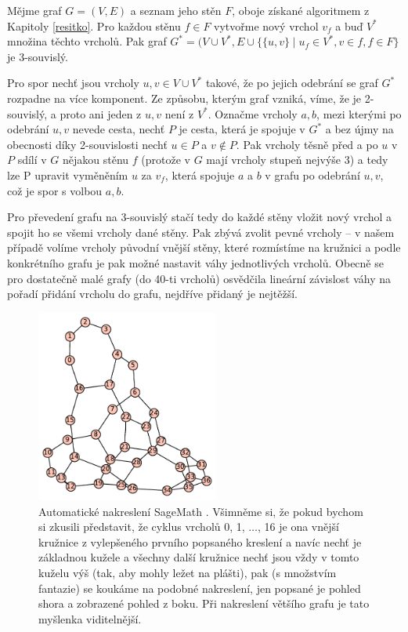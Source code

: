 \begin{tvrz} \label{prevodNa3Spoj}
Mějme graf $G=(V,E)$ a seznam jeho stěn $F$, oboje získané algoritmem z Kapitoly \ref{resitko}. Pro každou stěnu $f \in F$ vytvořme nový vrchol $v_f$ a buď $V^*$ množina těchto vrcholů.  Pak graf $G^* = (V \cup V^*, E \cup \lbrace \lbrace u,v \rbrace \mid u_f \in V^*, v \in f, f \in F\rbrace$ je 3-souvislý.
\end{tvrz}

\begin{dukaz}
Pro spor nechť jsou vrcholy $u,v  \in V\cup V^*$ takové, že po jejich odebrání se graf $G^*$ rozpadne na více komponent.  Ze způsobu, kterým graf vzniká, víme, že je 2-souvislý, a proto ani jeden z $u,v$ není z $V^*$. Označme vrcholy $a,b$, mezi kterými po odebrání $u,v$ nevede cesta, nechť $P$ je cesta, která je spojuje v $G^*$ a bez újmy na obecnosti díky 2-souvislosti nechť $u \in P$ a $v \notin P$. Pak vrcholy těsně před a po $u$ v $P$ sdílí v $G$ nějakou stěnu $f$ (protože v $G$ mají vrcholy stupeň nejvýše 3) a tedy lze P upravit vyměněním $u$ za $v_f$, která spojuje $a$ a $b$ v grafu po odebrání $u,v$, což je spor s volbou $a,b$.
\end{dukaz}

Pro převedení grafu na 3-souvislý stačí tedy do každé stěny vložit nový vrchol a spojit ho se všemi vrcholy dané stěny. Pak zbývá zvolit pevné vrcholy -- v našem případě volíme vrcholy původní vnější stěny, které rozmístíme na kružnici a podle konkrétního grafu je pak možné nastavit váhy jednotlivých vrcholů. Obecně se pro dostatečně malé grafy (do 40-ti vrcholů) osvědčila lineární závislost váhy na pořadí přidání vrcholu do grafu, nejdříve přidaný je nejtěžší.

\begin{figure}[h]\centering
\includegraphics[width = 60mm]{../img/sageplot}
\caption{Automatické nakreslení SageMath \cite{sagemath}. Všimněme si, že pokud bychom si zkusili představit, že cyklus vrcholů 0, 1, $\dots$, 16 je ona vnější kružnice z vylepšeného prvního popsaného kreslení a navíc nechť je základnou kužele a všechny další kružnice nechť jsou vždy v tomto kuželu výš (tak, aby mohly ležet na plášti), pak (s množstvím fantazie) se koukáme na podobné nakreslení, jen popsané je pohled shora a zobrazené pohled z boku. Při nakreslení většího grafu je tato myšlenka viditelnější.}
\label{obr:sageplot}
\end{figure}


